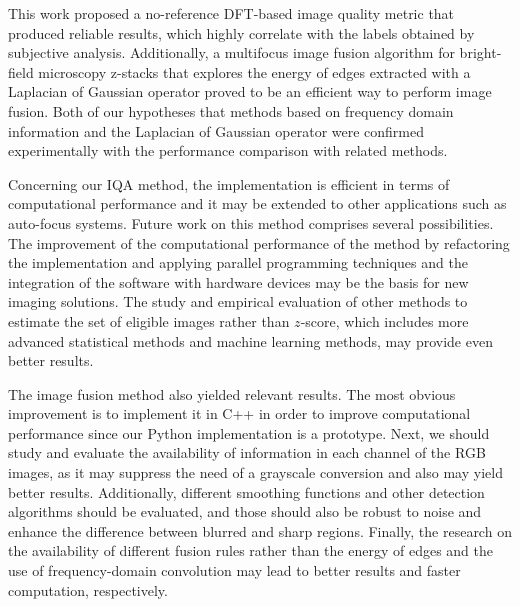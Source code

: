 This work proposed a no-reference DFT-based image quality metric that produced reliable results, which highly correlate with the labels obtained by subjective analysis. Additionally, a multifocus image fusion algorithm for bright-field microscopy z-stacks that explores the energy of edges extracted with a Laplacian of Gaussian operator proved to be an efficient way to perform image fusion. Both of our hypotheses that methods based on frequency domain information and the Laplacian of Gaussian operator were confirmed experimentally with the performance comparison with related methods.

Concerning our IQA method, the implementation is efficient in terms of computational performance and it may be extended to other applications such as auto-focus systems. Future work on this method comprises several possibilities. The improvement of the computational performance of the method by refactoring the implementation and applying parallel programming techniques and the integration of the software with hardware devices may be the basis for new imaging solutions. The study and empirical evaluation of other methods to estimate the set of eligible images rather than $z$-score, which includes more advanced statistical methods and machine learning methods, may provide even better results.

The image fusion method also yielded relevant results. The most obvious improvement is to implement it in C++ in order to improve computational performance since our Python implementation is a prototype. Next, we should study and evaluate the availability of information in each channel of the RGB images, as it may suppress the need of a grayscale conversion and also may yield better results. Additionally, different smoothing functions and other detection algorithms should be evaluated, and those should also be robust to noise and enhance the difference between blurred and sharp regions. Finally, the research on the availability of different fusion rules rather than the energy of edges and the use of frequency-domain convolution may lead to better results and faster computation, respectively.